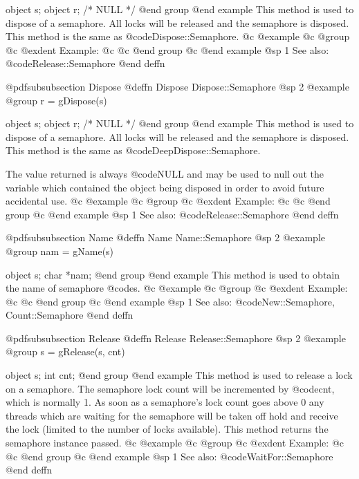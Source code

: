 object  s;
object  r;     /*  NULL  */
@end group
@end example
This method is used to dispose of a semaphore.  All locks will be released
and the semaphore is disposed.  This method is the same as
@code{Dispose::Semaphore}.
@c @example
@c @group
@c @exdent Example:
@c 
@c @end group
@c @end example
@sp 1
See also:  @code{Release::Semaphore}
@end deffn












@pdfsubsubsection {Dispose}
@deffn {Dispose} Dispose::Semaphore
@sp 2
@example
@group
r = gDispose(s)

object  s;
object  r;     /*  NULL  */
@end group
@end example
This method is used to dispose of a semaphore.  All locks will be released
and the semaphore is disposed.  This method is the same as
@code{DeepDispose::Semaphore}.

The value returned is always @code{NULL} and may be used to null out
the variable which contained the object being disposed in order to
avoid future accidental use.
@c @example
@c @group
@c @exdent Example:
@c 
@c @end group
@c @end example
@sp 1
See also:  @code{Release::Semaphore}
@end deffn










@pdfsubsubsection {Name}
@deffn {Name} Name::Semaphore
@sp 2
@example
@group
nam = gName(s)

object  s;
char    *nam;
@end group
@end example
This method is used to obtain the name of semaphore @code{s}.
@c @example
@c @group
@c @exdent Example:
@c 
@c @end group
@c @end example
@sp 1
See also:  @code{New::Semaphore, Count::Semaphore}
@end deffn








@pdfsubsubsection {Release}
@deffn {Release} Release::Semaphore
@sp 2
@example
@group
s = gRelease(s, cnt)

object  s;
int     cnt;
@end group
@end example
This method is used to release a lock on a semaphore.  The semaphore
lock count will be incremented by @code{cnt}, which is normally 1.
As soon as a semaphore's lock count goes above 0 any threads which
are waiting for the semaphore will be taken off hold and receive
the lock (limited to the number of locks available).  This method
returns the semaphore instance passed.
@c @example
@c @group
@c @exdent Example:
@c 
@c @end group
@c @end example
@sp 1
See also:  @code{WaitFor::Semaphore}
@end deffn










